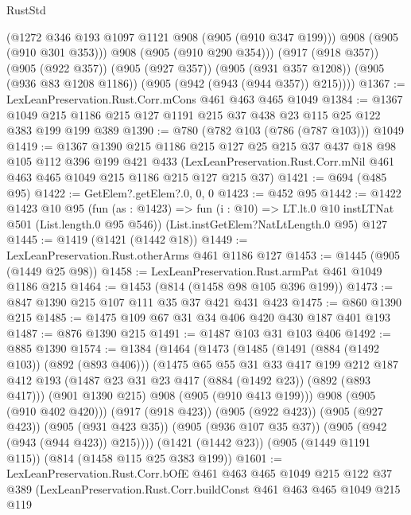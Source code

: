 \begin{lexlean}{RustStd}
\begin{coremodule}
            (@1272 @346 @193 @1097 @1121 @908 (@905 (@910 @347 @199)))
            @908
            (@905 (@910 @301 @353)))
          @908
          (@905 (@910 @290 @354)))
        (@917 (@918 @357))
        (@905 (@922 @357))
        (@905 (@927 @357))
        (@905 (@931 @357 @1208))
        (@905 (@936 @83 @1208 @1186))
        (@905 (@942 (@943 (@944 @357)) @215))))
@1367 := LexLeanPreservation.Rust.Corr.mCons @461 @463 @465 @1049
@1384 := @1367 @1049 @215 @1186 @215 @127 @1191 @215 @37 @438 @23 @115 @25 @122 @383 @199 @199 @389
@1390 := @780 (@782 @103 (@786 (@787 @103))) @1049
@1419 := @1367
    @1390
    @215
    @1186
    @215
    @127
    @25
    @215
    @37
    @437
    @18
    @98
    @105
    @112
    @396
    @199
    @421
    @433
    (LexLeanPreservation.Rust.Corr.mNil @461 @463 @465 @1049 @215 @1186 @215 @127 @215 @37)
@1421 := @694 (@485 @95)
@1422 := GetElem?.getElem?.{0, 0, 0}
@1423 := @452 @95
@1442 := @1422
    @1423
    @10
    @95
    (fun (as : @1423) => fun (i : @10) => LT.lt.{0} @10 instLTNat @501 (List.length.{0} @95 @546))
    (List.instGetElem?NatLtLength.{0} @95)
    @127
@1445 := @1419 (@1421 (@1442 @18))
@1449 := LexLeanPreservation.Rust.otherArms @461 @1186 @127
@1453 := @1445 (@905 (@1449 @25 @98))
@1458 := LexLeanPreservation.Rust.armPat @461 @1049 @1186 @215
@1464 := @1453 (@814 (@1458 @98 @105 @396 @199))
@1473 := @847 @1390 @215 @107 @111 @35 @37 @421 @431 @423
@1475 := @860 @1390 @215
@1485 := @1475 @109 @67 @31 @34 @406 @420 @430 @187 @401 @193
@1487 := @876 @1390 @215
@1491 := @1487 @103 @31 @103 @406
@1492 := @885 @1390
@1574 := @1384
    (@1464
      (@1473
        (@1485
          (@1491 (@884 (@1492 @103)) (@892 (@893 @406)))
          (@1475
            @65
            @55
            @31
            @33
            @417
            @199
            @212
            @187
            @412
            @193
            (@1487 @23 @31 @23 @417 (@884 (@1492 @23)) (@892 (@893 @417)))
            (@901 @1390 @215)
            @908
            (@905 (@910 @413 @199)))
          @908
          (@905 (@910 @402 @420)))
        (@917 (@918 @423))
        (@905 (@922 @423))
        (@905 (@927 @423))
        (@905 (@931 @423 @35))
        (@905 (@936 @107 @35 @37))
        (@905 (@942 (@943 (@944 @423)) @215))))
    (@1421 (@1442 @23))
    (@905 (@1449 @1191 @115))
    (@814 (@1458 @115 @25 @383 @199))
@1601 := LexLeanPreservation.Rust.Corr.bOfE
    @461
    @463
    @465
    @1049
    @215
    @122
    @37
    @389
    (LexLeanPreservation.Rust.Corr.buildConst
      @461
      @463
      @465
      @1049
      @215
      @119

\end{coremodule}
\end{lexlean}
